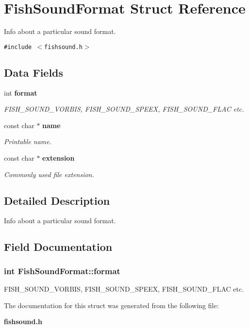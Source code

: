 \section{FishSoundFormat Struct Reference}
\label{structFishSoundFormat}
Info about a particular sound format.  


{\tt \#include $<$fishsound.h$>$}

\subsection*{Data Fields}
\begin{CompactItemize}
\item 
int {\bf format}
\begin{CompactList}\small\item\em FISH\_\-SOUND\_\-VORBIS, FISH\_\-SOUND\_\-SPEEX, FISH\_\-SOUND\_\-FLAC etc. \item\end{CompactList}\item 
const char $\ast$ {\bf name}\label{structFishSoundFormat_cb3416e65b3622a229f5eb835edc1ac0}

\begin{CompactList}\small\item\em Printable name. \item\end{CompactList}\item 
const char $\ast$ {\bf extension}\label{structFishSoundFormat_da9c478e59bad75dc2a0b4cb012534b9}

\begin{CompactList}\small\item\em Commonly used file extension. \item\end{CompactList}\end{CompactItemize}


\subsection{Detailed Description}
Info about a particular sound format. 

\subsection{Field Documentation}
\subsubsection[{format}]{\setlength{\rightskip}{0pt plus 5cm}int {\bf FishSoundFormat::format}}\label{structFishSoundFormat_d8e6fadc27abace836321a7f92971c2b}


FISH\_\-SOUND\_\-VORBIS, FISH\_\-SOUND\_\-SPEEX, FISH\_\-SOUND\_\-FLAC etc. 



The documentation for this struct was generated from the following file:\begin{CompactItemize}
\item 
{\bf fishsound.h}\end{CompactItemize}
